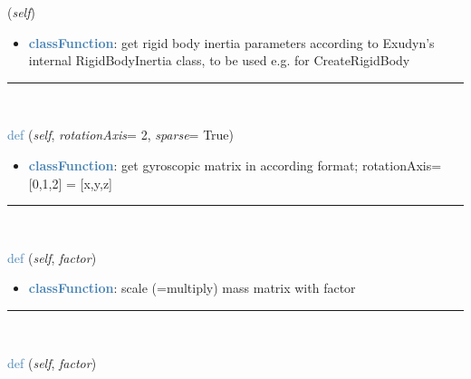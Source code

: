 \begin{itemize}[leftmargin=1.4cm]
\begin{itemize}[leftmargin=1.4cm]
\begin{itemize}[leftmargin=1.4cm]
\begin{itemize}[leftmargin=0.5cm]
\begin{itemize}[leftmargin=1.4cm]
\begin{itemize}[leftmargin=1.4cm]
\begin{itemize}[leftmargin=1.4cm]
\begin{itemize}[leftmargin=0.5cm]
\begin{flushleft}
({\it self})
\end{flushleft}
\setlength{\itemindent}{0.7cm}
\begin{itemize}[leftmargin=0.7cm]
\item[--]\textcolor{steelblue}{\bf classFunction}: get rigid body inertia parameters according to Exudyn's internal RigidBodyInertia class, to be used e.g. for CreateRigidBody
\vspace{12pt}\end{itemize}
%
\noindent\rule{8cm}{0.75pt}\vspace{1pt} \\ 
\begin{flushleft}
\noindent \textcolor{steelblue}{def {\bf {}}}\label{sec:FEM:FEMinterface:GetGyroscopicMatrix}
({\it self}, {\it rotationAxis}= 2, {\it sparse}= True)
\end{flushleft}
\setlength{\itemindent}{0.7cm}
\begin{itemize}[leftmargin=0.7cm]
\item[--]\textcolor{steelblue}{\bf classFunction}: get gyroscopic matrix in according format; rotationAxis=[0,1,2] = [x,y,z]
\vspace{12pt}\end{itemize}
%
\noindent\rule{8cm}{0.75pt}\vspace{1pt} \\ 
\begin{flushleft}
\noindent \textcolor{steelblue}{def {\bf {}}}\label{sec:FEM:FEMinterface:ScaleMassMatrix}
({\it self}, {\it factor})
\end{flushleft}
\setlength{\itemindent}{0.7cm}
\begin{itemize}[leftmargin=0.7cm]
\item[--]\textcolor{steelblue}{\bf classFunction}: scale (=multiply) mass matrix with factor
\vspace{12pt}\end{itemize}
%
\noindent\rule{8cm}{0.75pt}\vspace{1pt} \\ 
\begin{flushleft}
\noindent \textcolor{steelblue}{def {\bf {}}}\label{sec:FEM:FEMinterface:ScaleStiffnessMatrix}
({\it self}, {\it factor})
\end{flushleft}

\end{itemize}
\end{itemize}
\end{itemize}
\end{itemize}
\end{itemize}
\end{itemize}
\end{itemize}
\end{itemize}
